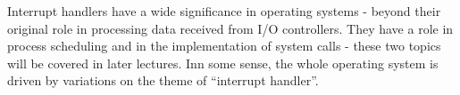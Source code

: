 Interrupt handlers have a wide significance in operating systems - beyond their original role in processing data received from I/O controllers. They have a role in process scheduling and in the implementation of system calls - these two topics will be covered in later lectures. Inn some sense, the whole operating system is driven by variations on the theme of ``interrupt handler''.